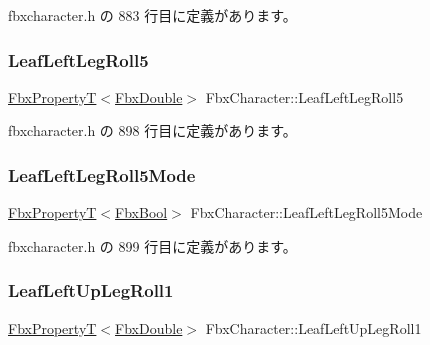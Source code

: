  fbxcharacter.\+h の 883 行目に定義があります。

\mbox{\label{class_fbx_character_aaacb001144169bc23af82338a4908f9f}} 
\subsubsection{\texorpdfstring{Leaf\+Left\+Leg\+Roll5}{LeafLeftLegRoll5}}
{\footnotesize\ttfamily \hyperlink{class_fbx_property_t}{Fbx\+PropertyT}$<$\hyperlink{fbxtypes_8h_a171e72a1c46fc15c1a6c9c31948c1c5b}{Fbx\+Double}$>$ Fbx\+Character\+::\+Leaf\+Left\+Leg\+Roll5}



 fbxcharacter.\+h の 898 行目に定義があります。

\mbox{\label{class_fbx_character_a665e7a11aece9fedc4f101c62dd068b1}} 
\subsubsection{\texorpdfstring{Leaf\+Left\+Leg\+Roll5\+Mode}{LeafLeftLegRoll5Mode}}
{\footnotesize\ttfamily \hyperlink{class_fbx_property_t}{Fbx\+PropertyT}$<$\hyperlink{fbxtypes_8h_a92e0562b2fe33e76a242f498b362262e}{Fbx\+Bool}$>$ Fbx\+Character\+::\+Leaf\+Left\+Leg\+Roll5\+Mode}



 fbxcharacter.\+h の 899 行目に定義があります。

\mbox{\label{class_fbx_character_a6674f17d60367d55cbe2b903a688167a}} 
\subsubsection{\texorpdfstring{Leaf\+Left\+Up\+Leg\+Roll1}{LeafLeftUpLegRoll1}}
{\footnotesize\ttfamily \hyperlink{class_fbx_property_t}{Fbx\+PropertyT}$<$\hyperlink{fbxtypes_8h_a171e72a1c46fc15c1a6c9c31948c1c5b}{Fbx\+Double}$>$ Fbx\+Character\+::\+Leaf\+Left\+Up\+Leg\+Roll1}



